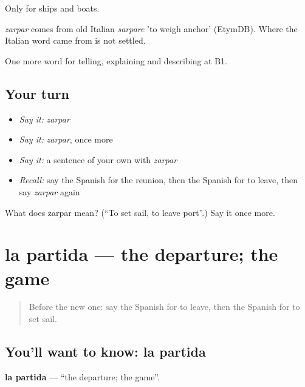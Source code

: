Only for ships and boats.

\begin{cousinweb}
\emph{zarpar} comes from old Italian \emph{sarpare} 'to weigh anchor' (EtymDB). Where the Italian word came from is not settled.
\end{cousinweb}

\begin{grammarlens}[title={What you've built}]
One more word for telling, explaining and describing at B1.
\end{grammarlens}

\subsection*{Your turn}
\begin{itemize}
\raggedright
  \item \emph{Say it:} \emph{zarpar}
  \item \emph{Say it:} \emph{zarpar}, once more
  \item \emph{Say it:} a sentence of your own with \emph{zarpar}
  \item \emph{Recall:} say the Spanish for the reunion, then the Spanish for to leave, then say \emph{zarpar} again
\end{itemize}

\begin{tcolorbox}[breakable,colback=teal!4,colframe=teal!35!black,title={Before you move on}]
What does zarpar mean? (\textquotedblleft{}To set sail, to leave port\textquotedblright{}.) Say it once more.
\end{tcolorbox}
\section[la partida]{la partida — the departure; the game}

\label{lesson:ES-C561-partida}



\begin{quote}
Before the new one: say the Spanish for to leave, then the Spanish for to set sail.
\end{quote}

\subsection*{You'll want to know: la partida}
\textbf{la partida} — \textquotedblleft{}the departure; the game\textquotedblright{}.

